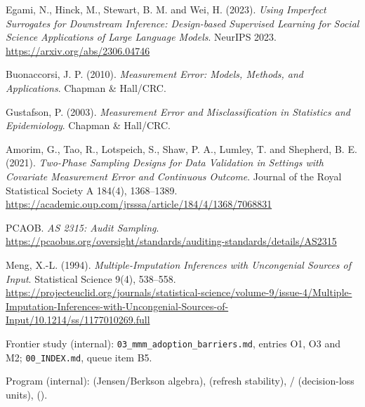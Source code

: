 \begin{enumerate}[label={[\arabic*]},leftmargin=2.5em]
\item Egami, N., Hinck, M., Stewart, B. M. and Wei, H. (2023). \emph{Using Imperfect Surrogates for Downstream Inference: Design-based Supervised Learning for Social Science Applications of Large Language Models}. NeurIPS 2023. \url{https://arxiv.org/abs/2306.04746}
\item Buonaccorsi, J. P. (2010). \emph{Measurement Error: Models, Methods, and Applications}. Chapman \& Hall/CRC.
\item Gustafson, P. (2003). \emph{Measurement Error and Misclassification in Statistics and Epidemiology}. Chapman \& Hall/CRC.
\item Amorim, G., Tao, R., Lotspeich, S., Shaw, P. A., Lumley, T. and Shepherd, B. E. (2021). \emph{Two-Phase Sampling Designs for Data Validation in Settings with Covariate Measurement Error and Continuous Outcome}. Journal of the Royal Statistical Society A 184(4), 1368--1389. \url{https://academic.oup.com/jrsssa/article/184/4/1368/7068831}
\item PCAOB. \emph{AS 2315: Audit Sampling}. \url{https://pcaobus.org/oversight/standards/auditing-standards/details/AS2315}
\item Meng, X.-L. (1994). \emph{Multiple-Imputation Inferences with Uncongenial Sources of Input}. Statistical Science 9(4), 538--558. \url{https://projecteuclid.org/journals/statistical-science/volume-9/issue-4/Multiple-Imputation-Inferences-with-Uncongenial-Sources-of-Input/10.1214/ss/1177010269.full}
\item Frontier study (internal): \texttt{03\_mmm\_adoption\_barriers.md}, entries O1, O3 and M2; \texttt{00\_INDEX.md}, queue item B5.
\item Program (internal):  (Jensen/Berkson algebra),  (refresh stability), / (decision-loss units),  ().
\end{enumerate}
\endgroup
